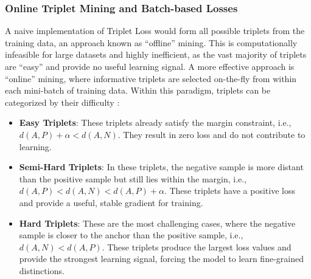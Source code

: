 \subsubsection{Online Triplet Mining and Batch-based Losses}
A naive implementation of Triplet Loss would form all possible triplets from the training data, an approach known as ``offline'' mining. This is computationally infeasible for large datasets and highly inefficient, as the vast majority of triplets are ``easy'' and provide no useful learning signal. A more effective approach is ``online'' mining, where informative triplets are selected on-the-fly from within each mini-batch of training data. Within this paradigm, triplets can be categorized by their difficulty :
\begin{itemize}
    \item \textbf{Easy Triplets}: These triplets already satisfy the margin constraint, i.e., \(d(A,P)+\alpha<d(A,N)\). They result in zero loss and do not contribute to learning.
    \item \textbf{Semi-Hard Triplets}: In these triplets, the negative sample is more distant than the positive sample but still lies within the margin, i.e., \(d(A,P)<d(A,N)<d(A,P)+\alpha\). These triplets have a positive loss and provide a useful, stable gradient for training.
    \item \textbf{Hard Triplets}: These are the most challenging cases, where the negative sample is closer to the anchor than the positive sample, i.e., \(d(A,N)<d(A,P)\). These triplets produce the largest loss values and provide the strongest learning signal, forcing the model to learn fine-grained distinctions.
\end{itemize}

